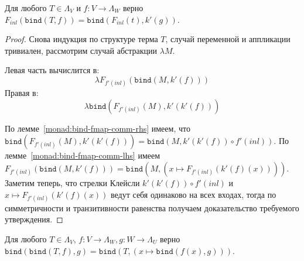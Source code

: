 \begin{lemma}
  \label{monad:bind-fmap-comm}
  Для любого $T \in \Lambda_{V}$ и $f : V \to \Lambda_{W}$ верно $F_{inl}(\texttt{bind}(T, f)) = \texttt{bind}(F_{inl}(t), k'(g))$.
\end{lemma}

\begin{proof}
  Снова индукция по структуре терма $T$, случай переменной и аппликации тривиален, рассмотрим случай абстракции $\lambda M$.

  Левая часть вычислится в:
  $$ \lambda F_{f'(inl)}(\texttt{bind}(M, k'(f))) $$
  Правая в:
  $$ \lambda \texttt{bind}(F_{f'(inl)}(M), k'(k'(f))) $$

  По лемме~\ref{monad:bind-fmap-comm-rhs} имеем, что $\texttt{bind}(F_{f'(inl)}(M), k'(k'(f))) = \texttt{bind}(M, k'(k'(f)) \circ f'(inl))$. По лемме~\ref{monad:bind-fmap-comm-lhs} имеем $F_{f'(inl)}(\texttt{bind}(M, k'(f))) = \texttt{bind}(M, (x \mapsto F_{f'(inl)}(k'(f)(x))))$. Заметим теперь, что стрелки Клейсли $k'(k'(f)) \circ f'(inl)$ и $x \mapsto F_{f'(inl)}(k'(f)(x))$ ведут себя одинаково на всех входах, тогда по симметричности и транзитивности равенства получаем доказательство требуемого утверждения.
\end{proof}

\begin{prop}
  Для любого $T \in \Lambda_{V}$, $f : V \to \Lambda_{W}, g : W \to \Lambda_{U}$ верно $\texttt{bind}(\texttt{bind}(T, f), g) = \texttt{bind}(T, (x \mapsto \texttt{bind}(f(x), g)) )$.
\end{prop}


